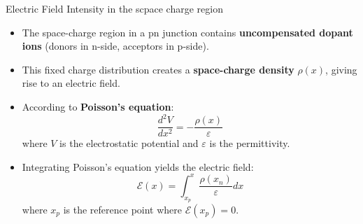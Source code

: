 \begin{frame}{Electric Field Intensity in the scpace charge region}
    \begin{itemize}
        \item The space-charge region in a pn junction contains \textbf{uncompensated dopant ions} (donors in n-side, acceptors in p-side).
        \item This fixed charge distribution creates a \textbf{space-charge density} $\rho(x)$, giving rise to an electric field.
        \item According to \textbf{Poisson's equation}:
        \begin{equation}
            \frac{d^2 V}{dx^2} = -\frac{\rho(x)}{\varepsilon}
        \end{equation}
        where $V$ is the electrostatic potential and $\varepsilon$ is the permittivity.

        \item Integrating Poisson's equation yields the electric field:
        \begin{equation}
            \mathcal{E}(x) = \int_{x_p}^x \frac{\rho(x_n)}{\varepsilon} dx
        \end{equation}
        where $x_p$ is the reference point where $\mathcal{E}(x_p) = 0$.
    \end{itemize}
\end{frame}

